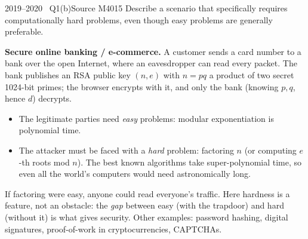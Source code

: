\documentclass[11pt,a4paper]{article}
\begin{document}
\begin{question}{2019--2020 \textbullet\ Q1(b)}{Source M40}{15}
Describe a scenario that specifically requires computationally hard problems, even though easy problems are generally preferable.
\end{question}
\begin{solution}
\textbf{Secure online banking / e-commerce.} A customer sends a card number to a bank over the open Internet, where an eavesdropper can read every packet. The bank publishes an RSA public key $(n,e)$ with $n=pq$ a product of two secret 1024-bit primes; the browser encrypts with it, and only the bank (knowing $p,q$, hence $d$) decrypts.
\begin{itemize}
\item The legitimate parties need \emph{easy} problems: modular exponentiation is polynomial time.
\item The attacker must be faced with a \emph{hard} problem: factoring $n$ (or computing $e$-th roots mod $n$). The best known algorithms take super-polynomial time, so even all the world's computers would need astronomically long.
\end{itemize}
If factoring were easy, anyone could read everyone's traffic. Here hardness is a feature, not an obstacle: the \emph{gap} between easy (with the trapdoor) and hard (without it) is what gives security. Other examples: password hashing, digital signatures, proof-of-work in cryptocurrencies, CAPTCHAs.
\end{solution}
\end{document}
